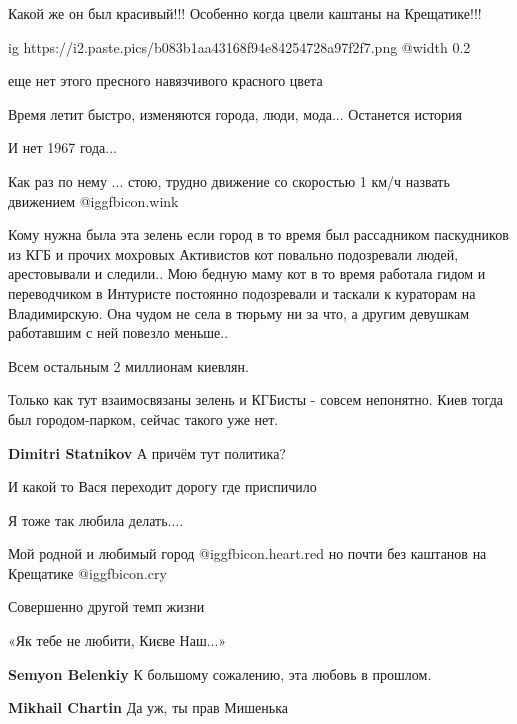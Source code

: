 \begin{itemize}
Какой же он был красивый!!! Особенно когда цвели каштаны на Крещатике!!!

\ifcmt
  ig https://i2.paste.pics/b083b1aa43168f94e84254728a97f2f7.png
  @width 0.2
\fi

еще нет этого пресного навязчивого красного цвета

Время летит быстро, изменяются города, люди, мода... Останется история

И нет 1967 года...

Как раз по нему ... стою, трудно движение со скоростью 1 км/ч назвать движением  @igg{fbicon.wink} 


Кому нужна была эта зелень если город в то время был рассадником паскудников из
КГБ и прочих мохровых Активистов кот повально подозревали людей, арестовывали и
следили.. Мою бедную маму кот в то время работала гидом и переводчиком в
Интуристе постоянно подозревали и таскали к кураторам на Владимирскую. Она
чудом не села в тюрьму ни за что, а другим девушкам работавшим с ней повезло
меньше..

\begin{itemize} %
Всем остальным 2 миллионам киевлян.

Только как тут взаимосвязаны зелень и КГБисты - совсем непонятно.
Киев тогда был городом-парком, сейчас такого уже нет.

\textbf{Dimitri Statnikov} А причём тут политика?
\end{itemize} %

И какой то Вася переходит дорогу где приспичило

Я тоже так любила делать....

Мой родной и любимый город @igg{fbicon.heart.red} но почти без каштанов на Крещатике  @igg{fbicon.cry} 

Совершенно другой темп жизни

«Як тебе не любити,
Києве Наш...»

\begin{itemize} %
\textbf{Semyon Belenkiy} К большому сожалению, эта любовь в прошлом.

\textbf{Mikhail Chartin} Да уж, ты прав Мишенька
\end{itemize} %


\end{itemize}

